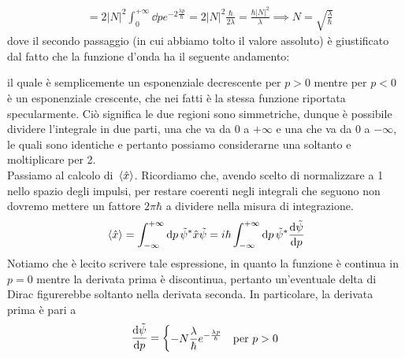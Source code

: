 \begin{soluzione}
\begin{equation*}
\begin{split}
         \\
         & =2|N|^2 \int_{0}^{+\infty} \dd{p} e^{-2\frac{\lambda p}{\hbar}}
         =2|N|^2\frac{\hbar}{2\lambda}=\frac{\hbar|N|^2}{\lambda}
         \implies
         N=\sqrt{\frac{\lambda}{\hbar}}
      \end{split}
   \end{equation*}
   dove il secondo passaggio (in cui abbiamo tolto il valore assoluto) è giustificato dal fatto che la funzione d'onda ha il seguente andamento:
   \begin{figure}[H]
      \centering
   \end{figure}
   il quale è semplicemente un esponenziale decrescente per $p>0$ mentre per $p<0$ è un esponenziale crescente, che nei fatti è la stessa funzione riportata specularmente. Ciò significa le due regioni sono simmetriche, dunque è possibile dividere l'integrale in due parti, una che va da 0 a $+\infty$ e una che va da 0 a $-\infty$, le quali sono identiche e pertanto possiamo considerarne una soltanto e moltiplicare per 2.\\
   Passiamo al calcolo di $\expval*{\hat{x}}$. Ricordiamo che, avendo scelto di normalizzare a 1 nello spazio degli impulsi, per restare coerenti negli integrali che seguono non dovremo mettere un fattore $2\pi\hbar$ a dividere nella misura di integrazione.
   \begin{equation*}
      \expval*{\hat{x}}
      =\int_{-\infty}^{+\infty} \dd{p} \tilde{\psi}^* \hat{x} \tilde{\psi}
      =i\hbar \int_{-\infty}^{+\infty} \dd{p} \tilde{\psi}^* \dv{\tilde{\psi}}{p}
   \end{equation*}
   Notiamo che è lecito scrivere tale espressione, in quanto la funzione è continua in $p=0$ mentre la derivata prima è discontinua, pertanto un'eventuale delta di Dirac figurerebbe soltanto nella derivata seconda. In particolare, la derivata prima è pari a
   \begin{equation*}
      \dv{\tilde{\psi}}{p}=
      \begin{dcases}
         -N\frac{\lambda}{\hbar}e^{-\frac{\lambda p}{\hbar}} & \text{per } p>0\\

\end{dcases}
\end{equation*}
\end{soluzione}
